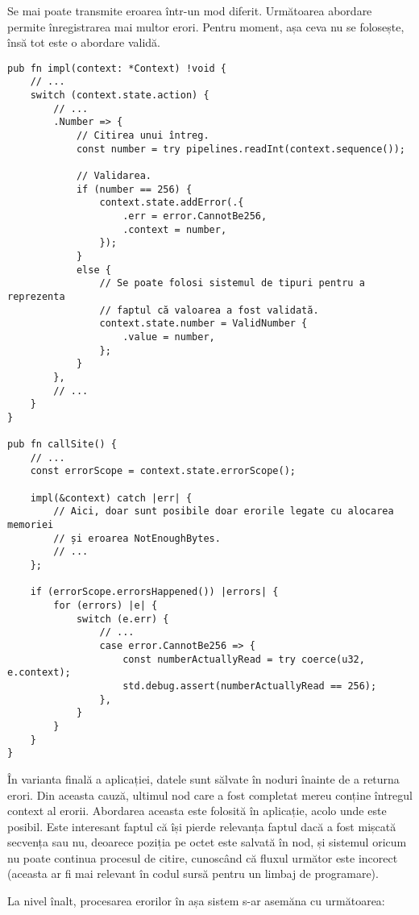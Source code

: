 \documentclass[a4paper,12pt]{report}
\begin{document}
Se mai poate transmite eroarea într-un mod diferit.
Următoarea abordare permite înregistrarea mai multor erori.
Pentru moment, așa ceva nu se folosește, însă tot este o abordare validă.

\begin{verbatim}
pub fn impl(context: *Context) !void {
    // ...
    switch (context.state.action) {
        // ...
        .Number => {
            // Citirea unui întreg.
            const number = try pipelines.readInt(context.sequence());

            // Validarea.
            if (number == 256) {
                context.state.addError(.{
                    .err = error.CannotBe256,
                    .context = number,
                });
            }
            else {
                // Se poate folosi sistemul de tipuri pentru a reprezenta
                // faptul că valoarea a fost validată.
                context.state.number = ValidNumber {
                    .value = number,
                };
            }
        },
        // ...
    }
}

pub fn callSite() {
    // ... 
    const errorScope = context.state.errorScope();

    impl(&context) catch |err| {
        // Aici, doar sunt posibile doar erorile legate cu alocarea memoriei
        // și eroarea NotEnoughBytes.
        // ...
    };

    if (errorScope.errorsHappened()) |errors| {
        for (errors) |e| {
            switch (e.err) {
                // ...
                case error.CannotBe256 => {
                    const numberActuallyRead = try coerce(u32, e.context);
                    std.debug.assert(numberActuallyRead == 256);
                },
            }
        }
    }
}
\end{verbatim}

În varianta finală a aplicației, datele sunt sălvate în noduri înainte de a returna erori.
Din aceasta cauză, ultimul nod care a fost completat mereu conține întregul context al erorii.
Abordarea aceasta este folosită în aplicație, acolo unde este posibil.
Este interesant faptul că își pierde relevanța faptul dacă a fost mișcată secvența sau nu,
deoarece poziția pe octet este salvată în nod, și sistemul oricum nu poate continua procesul de citire,
cunoscând că fluxul următor este incorect
(aceasta ar fi mai relevant în codul sursă pentru un limbaj de programare).

La nivel înalt, procesarea erorilor în așa sistem s-ar asemăna cu următoarea:
\end{document}
